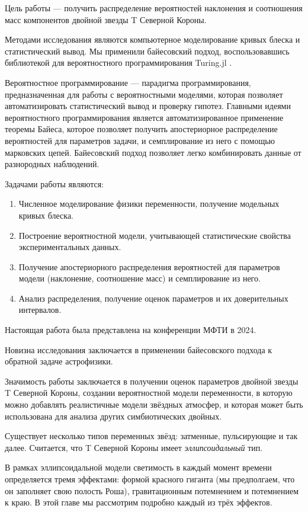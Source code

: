 Цель работы --- получить распределение вероятностей наклонения и соотношения масс компонентов двойной звезды T Северной Короны.

Методами исследования являются компьютерное моделирование кривых блеска и статистический вывод. Мы применили байесовский подход, воспользовавшись библиотекой для вероятностного программирования Turing.jl \cite{Turing}.

Вероятностное программирование --- парадигма программирования, предназначенная для работы с вероятностными моделями, которая позволяет автоматизировать статистический вывод и проверку гипотез. Главными идеями вероятностного программирования является автоматизированное применение теоремы Байеса, которое позволяет получить апостериорное распределение вероятностей для параметров задачи, и семплирование из него с помощью марковских цепей. Байесовский подход позволяет легко комбинировать данные от разнородных наблюдений.

Задачами работы являются:
\begin{enumerate}
    \item Численное моделирование физики переменности, получение модельных кривых блеска.
    \item Построение вероятностной модели, учитывающей статистические свойства экспериментальных данных.
    \item Получение апостериорного распределения вероятностей для параметров модели (наклонение, соотношение масс) и семплирование из него.
    \item Анализ распределения, получение оценок параметров и их доверительных интервалов.
\end{enumerate}

Настоящая работа была представлена на конференции МФТИ в 2024.

Новизна исследования заключается в применении байесовского подхода к обратной задаче астрофизики.

Значимость работы заключается в получении оценок параметров двойной звезды T Северной Короны, создании вероятностной модели переменности, в которую можно добавлять реалистичные модели звёздных атмосфер, и которая может быть использована для анализа других симбиотических двойных.



Существует несколько типов переменных звёзд: затменные, пульсирующие и так далее. Считается, что T Северной Короны имеет \emph{эллипсоидальный} тип.

В рамках эллипсоидальной модели светимость в каждый момент времени определяется тремя эффектами: формой красного гиганта (мы предполгаем, что он заполняет свою полость Роша), гравитационным потемнением и потемнением к краю. В этой главе мы рассмотрим подробно каждый из трёх эффектов.

